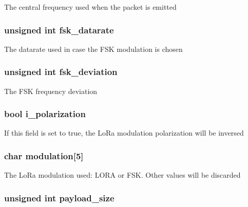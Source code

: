 The central frequency used when the packet is emitted \hypertarget{structdownstream__packet_ae4bd55e8e15052cb4ac21a9aba5866ad}{
\subsubsection[{fsk\-\_\-datarate}]{\setlength{\rightskip}{0pt plus 5cm}unsigned int fsk\-\_\-datarate}}\label{structdownstream__packet_ae4bd55e8e15052cb4ac21a9aba5866ad}
The datarate used in case the F\-S\-K modulation is chosen \hypertarget{structdownstream__packet_a3f5d6010dd5bdc3cedcb44caece43a59}{
\subsubsection[{fsk\-\_\-deviation}]{\setlength{\rightskip}{0pt plus 5cm}unsigned int fsk\-\_\-deviation}}\label{structdownstream__packet_a3f5d6010dd5bdc3cedcb44caece43a59}
The F\-S\-K frequency deviation \hypertarget{structdownstream__packet_a17de42e009f605885975928f7dad2d0c}{
\subsubsection[{i\-\_\-polarization}]{\setlength{\rightskip}{0pt plus 5cm}bool i\-\_\-polarization}}\label{structdownstream__packet_a17de42e009f605885975928f7dad2d0c}
If this field is set to true, the Lo\-Ra modulation polarization will be inversed \hypertarget{structdownstream__packet_a167264916b5fad13dd3dc470128e3eef}{
\subsubsection[{modulation}]{\setlength{\rightskip}{0pt plus 5cm}char modulation\mbox{[}5\mbox{]}}}\label{structdownstream__packet_a167264916b5fad13dd3dc470128e3eef}
The Lo\-Ra modulation used\-: L\-O\-R\-A or F\-S\-K. Other values will be discarded \hypertarget{structdownstream__packet_a75b5ec600c45b3430f28b8bcf16d868a}{
\subsubsection[{payload\-\_\-size}]{\setlength{\rightskip}{0pt plus 5cm}unsigned int payload\-\_\-size}}\label{structdownstream__packet_a75b5ec600c45b3430f28b8bcf16d868a}
